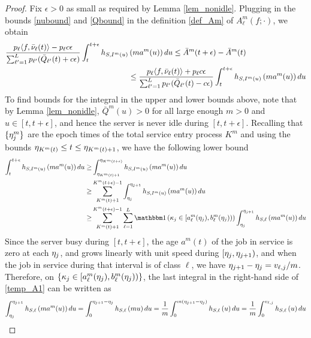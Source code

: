 \documentclass{article}
\theoremstyle{definition}
\numberwithin{equation}{section}
\begin{document}
\begin{proof}
Fix $\epsilon>0$ as small as required by Lemma \ref{lem_nonidle}. Plugging in the bounds \eqref{nubound} and \eqref{Qbound} in the definition \eqref{def_Am} of $A_\ell^m(f;\cdot)$, we obtain
\begin{align}
\frac{p_\ell \langle f,\bar{\nu}_\ell(t)\rangle-p_\ell c \epsilon}{\sum_{\ell'=1}^L p_{\ell'}(\bar {Q}_{\ell'}(t)+c\epsilon)}
\int_{t}^{t+\epsilon} h_{S,I^m(u)}&\left(ma^m(u)\right)  du\leq \bar A^m(t+\epsilon)-\bar A^m(t)\\
&\leq \frac{p_\ell \langle f,\bar{\nu}_\ell(t)\rangle+p_\ell c \epsilon}{\sum_{\ell'=1}^L p_{\ell'}(\bar {Q}_{\ell'}(t)-c\epsilon)}
\int_{t}^{t+\epsilon} h_{S,I^m(u)}\left(ma^m(u)\right)  du
\end{align}
To find bounds for the integral in the upper and lower bounds above, note that by Lemma \ref{lem_nonidle}, $\bar Q^m(u)>0$ for all large enough $m>0$ and $u\in[t,t+\epsilon]$, and hence the server is never idle during $[t,t+\epsilon]$. Recalling that $\{\eta_j^m\}$ are the epoch times of the total service entry process $K^m$ and using the bounds $\eta_{K^m(t)}\leq t\leq \eta_{K^m(t)+1}$, we have the following lower bound
\begin{align}\label{temp_A1}
\int_{t}^{t+\epsilon} h_{S,\class^m(u)}\left(m\age^m(u)\right)  du
\geq & \int_{\Ktime_{K^m(t)+1}}^{\Ktime_{K^m(t+\epsilon)}} h_{S,\class^m(u)}\left(m\age^m(u)\right)  du \notag\\
\geq &\sum_{K^m(t)+1}^{K^m(t+\epsilon)-1} \int_{\Ktime_j}^{\Ktime_{j+1}} h_{S,\class^m(u)}\left(m\age^m(u)\right)du \notag\\
\geq &\sum_{K^m(t)+1}^{K^m(t+\epsilon)-1} \sum_{\ell=1}^{L}\indic{\selector_j\in[a^m_\ell(\Ktime_j),b^m_\ell(\Ktime_j))}  \int_{\Ktime_j}^{\Ktime_{j+1}} h_{S,\ell}\left(m\age^m(u)\right)du
\end{align}
Since the server busy during $[t,t+\epsilon]$, the age $a^m(t)$ of the job in service is zero at each $\eta_j$, and grows linearly with unit speed during $[\eta_j,\eta_{j+1})$, and when the job in service during that interval is of class $\ell$, we have $\eta_{j+1}-\eta_{j}=v_{\ell,j}/m$. Therefore, on $\{\kappa_j\in[a^m_\ell(\eta_j),b^m_\ell(\eta_j))\}$, the last integral in the right-hand side of \eqref{temp_A1} can be written as
\begin{align}\label{temp_A2}
\int_{\eta_j}^{\eta_{j+1}} h_{S,\ell}\left(ma^m(u)\right)du = \int_{0}^{\eta_{j+1}-\eta_j} h_{S,\ell}\left(mu\right) du=\frac{1}{m}\int_{0}^{m(\eta_{j+1}-\eta_j)} h_{S,\ell}\left(u\right) du
   =\frac{1}{m} \int_{0}^{v_{\ell,j}} h_{S,\ell}\left(u\right) du
\end{align}


\end{proof}
\end{document}
